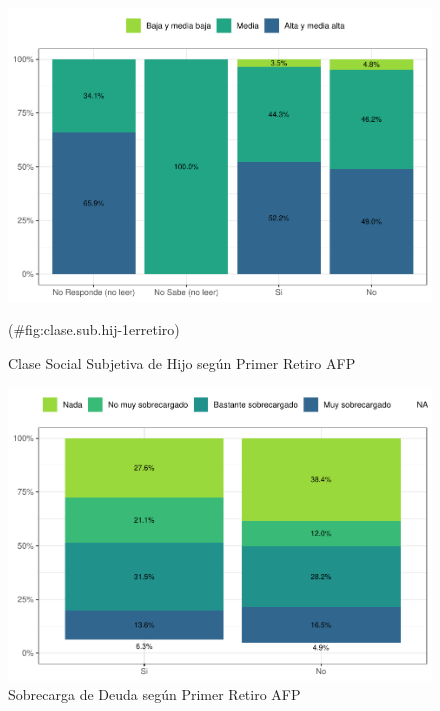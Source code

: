 \documentclass[
  12pt,
  openany]{book}
\begin{document}
\begin{figure}

{\centering \includegraphics{reporte-elsoc_files/figure-latex/clase.sub.hij-1erretiro-1} 

}

\caption{Clase Social Subjetiva de Hijo según Primer Retiro AFP}(\#fig:clase.sub.hij-1erretiro)
\end{figure}

\begin{figure}

{\centering \includegraphics{reporte-elsoc_files/figure-latex/endeud-1retiro-1} 

}

\caption{Sobrecarga de Deuda según Primer Retiro AFP}\label{fig:endeud-1retiro}
\end{figure}
\end{document}
